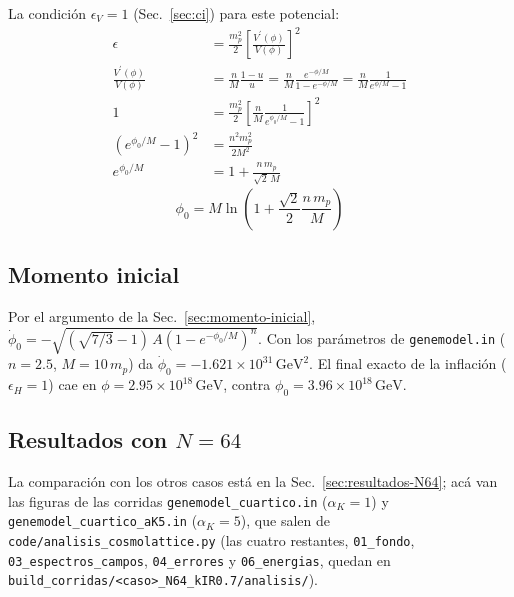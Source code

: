             La condición $\epsilon_V = 1$ (Sec.~\ref{sec:ci}) para este potencial:
            \begin{equation*}
                \begin{split}
                    \epsilon &= \frac{m_p^2}{2} \left[ \frac{V^\prime (\phi)}{V(\phi)} \right]^2\\
                    \frac{V^\prime (\phi)}{V(\phi)} &= \frac{n}{M} \frac{1-u}{u} = \frac{n}{M} \frac{e^{-\phi/M}}{1 - e^{-\phi/M}} = \frac{n}{M} \frac{1}{e^{\phi/M} - 1}\\
                    1 &= \frac{m_p^2}{2} \left[ \frac{n}{M} \frac{1}{e^{\phi_0/M} - 1} \right]^2\\
                    \left( e^{\phi_0/M} - 1 \right)^2 &= \frac{n^2 m_p^2}{2 M^2}\\
                    e^{\phi_0/M} &= 1 + \frac{n \, m_p}{\sqrt{2} \, M}
                \end{split}
            \end{equation*}
            \begin{equation}
                \phi_0 = M \ln \left( 1 + \frac{\sqrt{2}}{2} \frac{n \, m_p}{M} \right)
            \end{equation}

        \subsection{Momento inicial}
            \label{sec:momento-inicial-E}

            Por el argumento de la Sec.~\ref{sec:momento-inicial}, $\dot{\phi}_0 = -\sqrt{(\sqrt{7/3} - 1) \, A \left(1 - e^{-\phi_0/M}\right)^n}$. Con los parámetros de \texttt{genemodel.in} ($n = 2.5$, $M = 10\,m_p$) da $\dot\phi_0 = -1.621 \times 10^{31}\,\text{GeV}^2$. El final exacto de la inflación ($\epsilon_H = 1$) cae en $\phi = 2.95 \times 10^{18}\,\text{GeV}$, contra $\phi_0 = 3.96 \times 10^{18}\,\text{GeV}$.

        \subsection{Resultados con $N = 64$}
            \label{sec:emodel-N64}

            La comparación con los otros casos está en la Sec.~\ref{sec:resultados-N64}; acá van las figuras de las corridas \texttt{genemodel\_cuartico.in} ($\alpha_K = 1$) y \texttt{genemodel\_cuartico\_aK5.in} ($\alpha_K = 5$), que salen de \texttt{code/analisis\_cosmolattice.py} (las cuatro restantes, \texttt{01\_fondo}, \texttt{03\_espectros\_campos}, \texttt{04\_errores} y \texttt{06\_energias}, quedan en \texttt{build\_corridas/<caso>\_N64\_kIR0.7/analisis/}).

